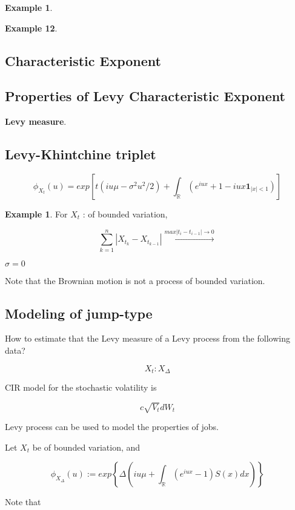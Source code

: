 \documentclass[12pt]{article}
\theoremstyle{nonumberbreak}
\begin{document}
\textbf{Example 1}. 




\textbf{Example 12}. 


\subsection{Characteristic Exponent}





\subsection{Properties of Levy Characteristic Exponent}

\textbf{Levy measure}. 


\subsection{Levy-Khintchine triplet}


$$
\phi_{X_t}(u) = exp \left[ t (iu\mu - \sigma^2 u^2 /2) + \int_\mathbb{R} \left( e^{iux} + 1 - iux \mathbf{1}_{|x| < 1} \right) \right]
$$

\textbf{Example 1}. For $X_t$ : of bounded variation,

$$
\sum_{k=1}^n | X_{t_k} - X_{t_{k-1}} |  \overset{max |t_i - t_{i-1}| \to 0}{\to} 
$$


$\sigma=0$

Note that the Brownian motion is not a process of bounded variation.




\subsection{Modeling of jump-type}

How to estimate that the Levy measure of a Levy process from the following data? 

$$
X_t: X_\Delta
$$


CIR model for the stochastic volatility is 

$$
c \sqrt{V_t} d W_t
$$


Levy process can be used to model the properties of jobs. 


Let $X_t$ be of bounded variation, and 

$$
\phi_{X_\Delta} (u) := exp \left\{  \Delta \left( iu\mu + \int_\mathbb{R} (e^{iux} - 1) S(x) dx \right)  \right\}
$$

Note that 
\end{document}
